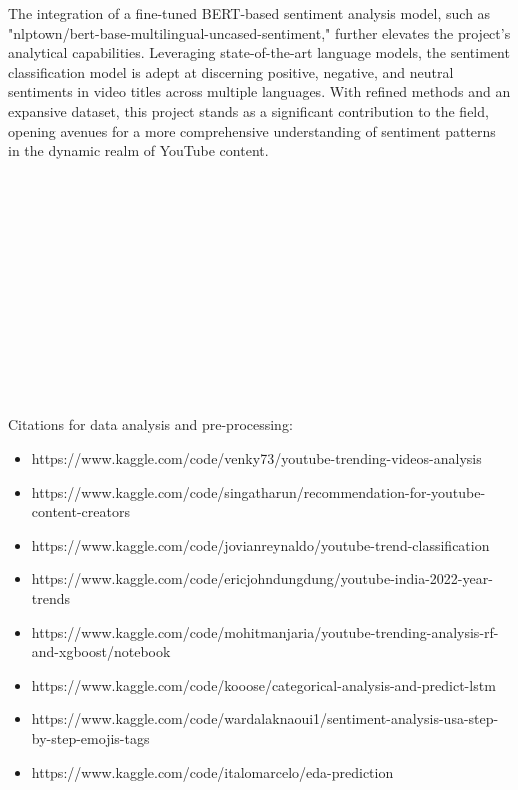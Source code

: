 \documentclass[12pt]{article}
\begin{document}
{The integration of a fine-tuned BERT-based sentiment analysis model, such as "nlptown/bert-base-multilingual-uncased-sentiment," further elevates the project's analytical capabilities. Leveraging state-of-the-art language models, the sentiment classification model is adept at discerning positive, negative, and neutral sentiments in video titles across multiple languages. With refined methods and an expansive dataset, this project stands as a significant contribution to the field, opening avenues for a more comprehensive understanding of sentiment patterns in the dynamic realm of YouTube content.}\\ \\ \\ \\ \\ \\ \\ \\ \\ \\ \\ \\ \\ \\

{Citations for data analysis and pre-processing:}
\begin{itemize}
\item {https://www.kaggle.com/code/venky73/youtube-trending-videos-analysis}
\item {https://www.kaggle.com/code/singatharun/recommendation-for-youtube-content-creators}
\item {https://www.kaggle.com/code/jovianreynaldo/youtube-trend-classification}
\item {https://www.kaggle.com/code/ericjohndungdung/youtube-india-2022-year-trends}
\item {https://www.kaggle.com/code/mohitmanjaria/youtube-trending-analysis-rf-and-xgboost/notebook}
\item {https://www.kaggle.com/code/kooose/categorical-analysis-and-predict-lstm}
\item {https://www.kaggle.com/code/wardalaknaoui1/sentiment-analysis-usa-step-by-step-emojis-tags}
\item {https://www.kaggle.com/code/italomarcelo/eda-prediction}\\
\end{itemize}
\end{document}
